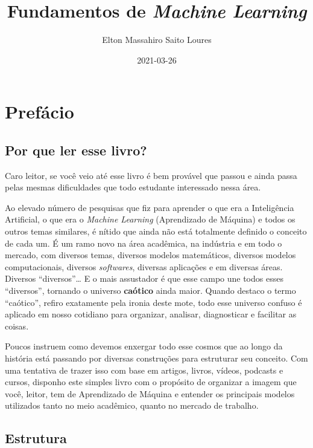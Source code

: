 \documentclass[
  openany]{book}
\title{Fundamentos de \emph{Machine Learning}}
\author{Elton Massahiro Saito Loures}
\date{2021-03-26}
\begin{document}
\maketitle

\renewcommand*\contentsname{Sumário}
{
\setcounter{tocdepth}{1}
\tableofcontents
}
\hypertarget{prefuxe1cio}{%
\chapter*{Prefácio}\label{prefuxe1cio}}

\hypertarget{por-que-ler-esse-livro}{%
\section{Por que ler esse livro?}\label{por-que-ler-esse-livro}}

Caro leitor, se você veio até esse livro é bem provável que passou e ainda passa pelas mesmas dificuldades que todo estudante interessado nessa área.

Ao elevado número de pesquisas que fiz para aprender o que era a Inteligência Artificial, o que era o \emph{Machine Learning} (Aprendizado de Máquina) e todos os outros temas similares, é nítido que ainda não está totalmente definido o conceito de cada um. É um ramo novo na área acadêmica, na indústria e em todo o mercado, com diversos temas, diversos modelos matemáticos, diversos modelos computacionais, diversos \emph{softwares}, diversas aplicações e em diversas áreas. Diversos ``diversos''\ldots{} E o mais assustador é que esse campo une todos esses ``diversos'', tornando o universo \textbf{caótico} ainda maior. Quando destaco o termo ``caótico'', refiro exatamente pela ironia deste mote, todo esse universo confuso é aplicado em nosso cotidiano para organizar, analisar, diagnosticar e facilitar as coisas.

Poucos instruem como devemos enxergar todo esse cosmos que ao longo da história está passando por diversas construções para estruturar seu conceito. Com uma tentativa de trazer isso com base em artigos, livros, vídeos, podcasts e cursos, disponho este simples livro com o propósito de organizar a imagem que você, leitor, tem de Aprendizado de Máquina e entender os principais modelos utilizados tanto no meio acadêmico, quanto no mercado de trabalho.

\hypertarget{estrutura}{%
\section{Estrutura}\label{estrutura}}
\end{document}

